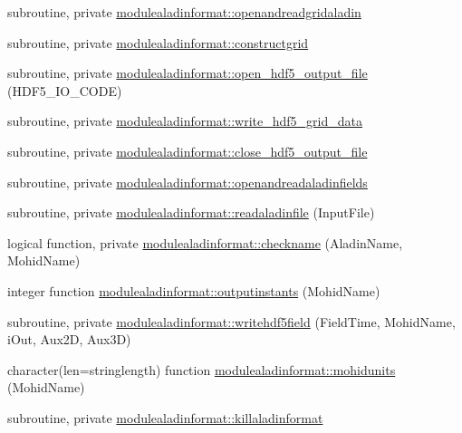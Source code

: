\begin{DoxyCompactItemize}
\item 
subroutine, private \mbox{\hyperlink{namespacemodulealadinformat_a4259301b2389ab6c64a24416eb73c157}{modulealadinformat\+::openandreadgridaladin}}
\item 
subroutine, private \mbox{\hyperlink{namespacemodulealadinformat_ab29f0499d468883233584caea8913297}{modulealadinformat\+::constructgrid}}
\item 
subroutine, private \mbox{\hyperlink{namespacemodulealadinformat_a554b3cf12b5ecedce22b2e607f931c70}{modulealadinformat\+::open\+\_\+hdf5\+\_\+output\+\_\+file}} (H\+D\+F5\+\_\+\+I\+O\+\_\+\+C\+O\+DE)
\item 
subroutine, private \mbox{\hyperlink{namespacemodulealadinformat_aae0b88b8feec26aab01ab56220392544}{modulealadinformat\+::write\+\_\+hdf5\+\_\+grid\+\_\+data}}
\item 
subroutine, private \mbox{\hyperlink{namespacemodulealadinformat_af21c9df5cd692b1f56a959cc52cba7d8}{modulealadinformat\+::close\+\_\+hdf5\+\_\+output\+\_\+file}}
\item 
subroutine, private \mbox{\hyperlink{namespacemodulealadinformat_a2b65697a3c42c8dc546ebf63e260e98f}{modulealadinformat\+::openandreadaladinfields}}
\item 
subroutine, private \mbox{\hyperlink{namespacemodulealadinformat_a01a53a6349fe1f7a1e5973e60abcf19d}{modulealadinformat\+::readaladinfile}} (Input\+File)
\item 
logical function, private \mbox{\hyperlink{namespacemodulealadinformat_ad07bce7e401d49446a1fcfabb4bb4fa8}{modulealadinformat\+::checkname}} (Aladin\+Name, Mohid\+Name)
\item 
integer function \mbox{\hyperlink{namespacemodulealadinformat_aa8356f98f813a0fe5edb9089053dc372}{modulealadinformat\+::outputinstants}} (Mohid\+Name)
\item 
subroutine, private \mbox{\hyperlink{namespacemodulealadinformat_a9b5030d175b249bcc7e4f88c7e8bffec}{modulealadinformat\+::writehdf5field}} (Field\+Time, Mohid\+Name, i\+Out, Aux2D, Aux3D)
\item 
character(len=stringlength) function \mbox{\hyperlink{namespacemodulealadinformat_a0e28e132a765a53e91eb16cf638b0b32}{modulealadinformat\+::mohidunits}} (Mohid\+Name)
\item 
subroutine, private \mbox{\hyperlink{namespacemodulealadinformat_a5391156d679edf14a9f2631410182102}{modulealadinformat\+::killaladinformat}}
\end{DoxyCompactItemize}
